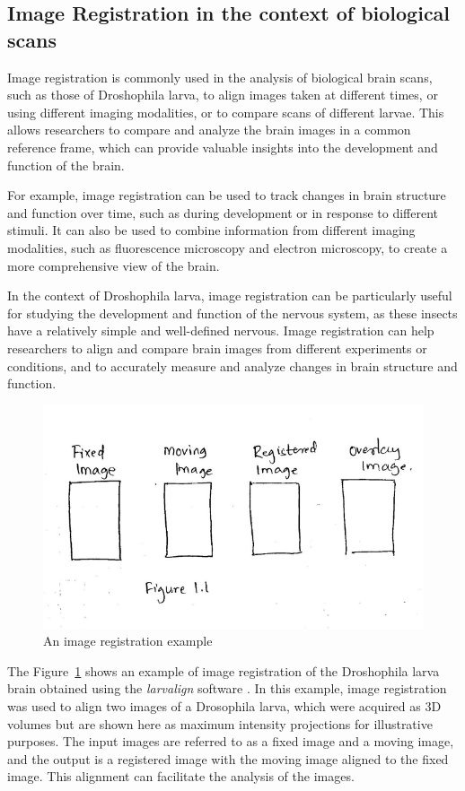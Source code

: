 \documentclass{report}
\begin{document}
	\subsection{Image Registration in the context of biological scans}
	Image registration is commonly used in the analysis of biological brain scans, such as those of Droshophila larva, to align images taken at different times, or using different imaging modalities, or to compare scans of different larvae. This allows researchers to compare and analyze the brain images in a common reference frame, which can provide valuable insights into the development and function of the brain.
	
	For example, image registration can be used to track changes in brain structure and function over time, such as during development or in response to different stimuli. It can also be used to combine information from different imaging modalities, such as fluorescence microscopy and electron microscopy, to create a more comprehensive view of the brain.
	
	In the context of Droshophila larva, image registration can be particularly useful for studying the development and function of the nervous system, as these insects have a relatively simple and well-defined nervous. Image registration can help researchers to align and compare brain images from different experiments or conditions, and to accurately measure and analyze changes in brain structure and function.
	
	\begin{figure}[h]
		\centering
		\includegraphics[width=0.7\columnwidth]{resources/chapter1/figure1.png}
		\caption{An image registration example}
		\label{fig:Registration}
	\end{figure}
	
	The Figure~\ref{fig:Registration} shows an example of image registration of the Droshophila larva brain obtained using the \textit{larvalign} software \cite{larvalign}. In this example, image registration was used to align two images of a Drosophila larva, which were acquired as 3D volumes but are shown here as maximum intensity projections for illustrative purposes. The input images are referred to as a fixed image and a moving image, and the output is a registered image with the moving image aligned to the fixed image. This alignment can facilitate the analysis of the images.
	
\end{document}
